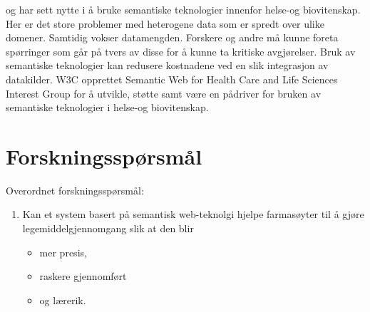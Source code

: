 \citet{monitor_bipolar_semanticweb} og \citet{semanticweb_clinical_guideline} har sett nytte i å bruke semantiske teknologier innenfor helse-og biovitenskap. Her er det store problemer med heterogene data som er spredt over ulike domener. Samtidig vokser datamengden. Forskere og andre må kunne foreta spørringer som går på tvers av disse for å kunne ta kritiske avgjørelser. Bruk av semantiske teknologier kan redusere kostnadene ved en slik integrasjon av datakilder. W3C opprettet Semantic Web for Health Care and Life Sciences Interest Group for å utvikle, støtte samt være en pådriver for bruken av semantiske teknologier i helse-og biovitenskap\citep{W3C_HCLSIG}.


\section{Forskningsspørsmål}
\label{innled:forskningsporsmal}


Overordnet forskningsspørsmål:

\begin{enumerate}
    \item Kan et system  basert på semantisk web-teknolgi hjelpe farmasøyter til å gjøre legemiddelgjennomgang slik at den blir 
    \begin{itemize}
        \item mer presis,
        \item raskere gjennomført
        \item og lærerik.
    \end{itemize}
\end{enumerate}

